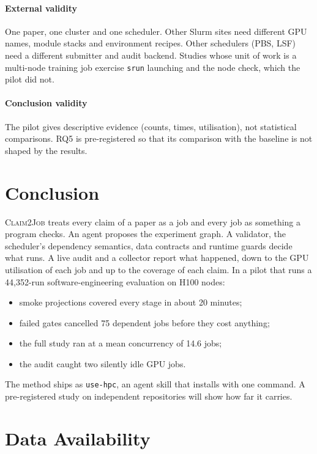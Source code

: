 \documentclass[pdflatex,sn-mathphys-num]{sn-jnl}
\theoremstyle{thmstyleone}%
\theoremstyle{thmstyletwo}%
\theoremstyle{thmstylethree}%
\newcommand{\cj}{\textsc{Claim2Job}}
\newcommand{\skill}{\texttt{use-hpc}}
\newcommand{\code}[1]{\texttt{#1}}
\begin{document}
\paragraph{External validity} One paper, one cluster and one scheduler.
Other Slurm sites need different GPU names, module stacks and environment
recipes. Other schedulers (PBS, LSF) need a different submitter and audit
backend. Studies whose unit of work is a multi-node training job exercise
\code{srun} launching and the node check, which the pilot did not.

\paragraph{Conclusion validity} The pilot gives descriptive evidence (counts,
times, utilisation), not statistical comparisons. RQ5 is pre-registered so that
its comparison with the baseline is not shaped by the results.

\section{Conclusion}\label{sec:conclusion}

\cj{} treats every claim of a paper as a job and every job as something a
program checks. An agent proposes the experiment graph. A validator, the
scheduler's dependency semantics, data contracts and runtime guards decide what
runs. A live audit and a collector report what happened, down to the GPU
utilisation of each job and up to the coverage of each claim. In a pilot that
runs a 44{,}352-run software-engineering evaluation on H100 nodes:
\begin{itemize}[leftmargin=1.4em, itemsep=1pt]
\item smoke projections covered every stage in about 20 minutes;
\item failed gates cancelled 75 dependent jobs before they cost anything;
\item the full study ran at a mean concurrency of 14.6 jobs;
\item the audit caught two silently idle GPU jobs.
\end{itemize}
The method ships as \skill{}, an agent skill that installs with one command. A
pre-registered study on independent repositories will show how far it
carries.

\section*{Data Availability}\label{sec:data}
\end{document}
